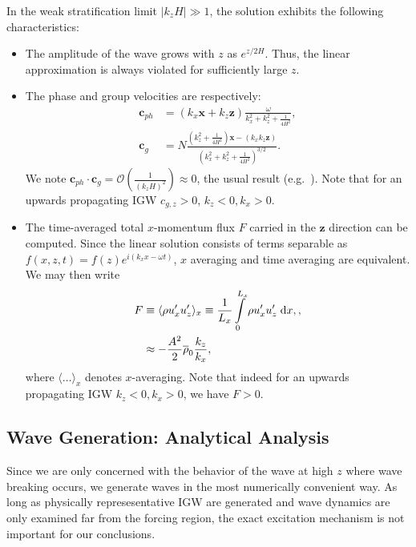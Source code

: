 \documentclass[
        fleqn,
        usenatbib,
    ]{mnras}
\newcommand*{\abs}[1]{\left|#1\right|}
\newcommand*{\ev}[1]{\langle#1\rangle}
\newcommand*{\p}[1]{\left(#1\right)}
\newcommand*{\bm}[1]{\boldsymbol{\mathbf{#1}}}
\begin{document}
In the weak stratification limit $\abs{k_{z}H} \gg 1$, the solution exhibits the
following characteristics:
\begin{itemize}
    \item The amplitude of the wave grows with $z$ as $e^{z/2H}$. Thus, the
        linear approximation is always violated for sufficiently large $z$.

    \item The phase and group velocities are respectively:
        \begin{align}
            \bm{c}_{ph} &=
                \p{k_{x}\bm{x} + k_{z}\bm{z}}\frac{\omega}
                {k_{x}^2 + k_{z}^2 + \frac{1}{4H^2}},\\
            \bm{c}_{g} &= N\frac{\p{k_{z}^2 + \frac{1}{4H^2}}\bm{x}
                - \p{k_{x}k_{z}\bm{z}}}
                {\p{k_{x}^2 + k_{z}^2 + \frac{1}{4H^2}}^{3/2}}.\label{eq:vg}
        \end{align}
        We note $\bm{c}_{ph} \cdot \bm{c}_g =
        \mathcal{O}\p{\frac{1}{\p{k_{z}H}^{2}}} \approx 0$, the usual result
        (e.g.~\cite{drazin,sutherland1}). Note that for an upwards propagating
        IGW $c_{g, z} > 0$, $k_z < 0, k_x > 0$.

    \item The time-averaged total $x$-momentum flux $F$ carried in the $\bm{z}$
        direction can be computed. Since the linear solution consists of terms
        separable as $f(x, z, t) = f(z)e^{i(k_{x}x - \omega t)}$, $x$
        averaging and time averaging are equivalent. We may then write
        \begin{align}
            F &\equiv \ev{\rho u_{x}' u_{z}'}_x \equiv
                \frac{1}{L_x}\int_0^{L_x}\limits \rho u_{x}'u_{z}'\;\mathrm{d}x,
                    \label{eq:F_def},\\
                &\approx -\frac{A^2}{2}\overline{\rho}_0\frac{k_{z}}{k_{x}},
                    \label{eq:S_lin}
        \end{align}
        where $\ev{\dots}_x$ denotes $x$-averaging. Note that indeed for an
        upwards propagating IGW $k_z < 0, k_x > 0$, we have $F > 0$.
\end{itemize}

\subsection{Wave Generation: Analytical Analysis}

Since we are only concerned with the behavior of the wave at high $z$ where wave
breaking occurs, we generate waves in the most numerically convenient way. As
long as physically represesentative IGW are generated and wave dynamics are only
examined far from the forcing region, the exact excitation mechanism is not
important for our conclusions.
\end{document}
